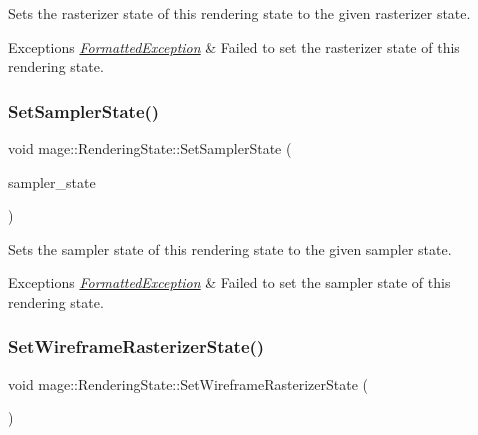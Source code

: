 Sets the rasterizer state of this rendering state to the given rasterizer state.


\begin{DoxyExceptions}{Exceptions}
{\em \hyperlink{structmage_1_1_formatted_exception}{Formatted\+Exception}} & Failed to set the rasterizer state of this rendering state. \\
\hline
\end{DoxyExceptions}
\hypertarget{structmage_1_1_rendering_state_a3829b0bd0eaedc664542481445ab226b}{}\label{structmage_1_1_rendering_state_a3829b0bd0eaedc664542481445ab226b} 
\subsubsection{\texorpdfstring{Set\+Sampler\+State()}{SetSamplerState()}}
{\footnotesize\ttfamily void mage\+::\+Rendering\+State\+::\+Set\+Sampler\+State (\begin{DoxyParamCaption}\item[{I\+D3\+D11\+Sampler\+State $\ast$}]{sampler\+\_\+state }\end{DoxyParamCaption})\hspace{0.3cm}{\ttfamily [noexcept]}}

Sets the sampler state of this rendering state to the given sampler state.


\begin{DoxyExceptions}{Exceptions}
{\em \hyperlink{structmage_1_1_formatted_exception}{Formatted\+Exception}} & Failed to set the sampler state of this rendering state. \\
\hline
\end{DoxyExceptions}
\hypertarget{structmage_1_1_rendering_state_a392b339b24950c71bfc7285bcca5eacf}{}\label{structmage_1_1_rendering_state_a392b339b24950c71bfc7285bcca5eacf} 
\subsubsection{\texorpdfstring{Set\+Wireframe\+Rasterizer\+State()}{SetWireframeRasterizerState()}}
{\footnotesize\ttfamily void mage\+::\+Rendering\+State\+::\+Set\+Wireframe\+Rasterizer\+State (\begin{DoxyParamCaption}{ }\end{DoxyParamCaption})}

